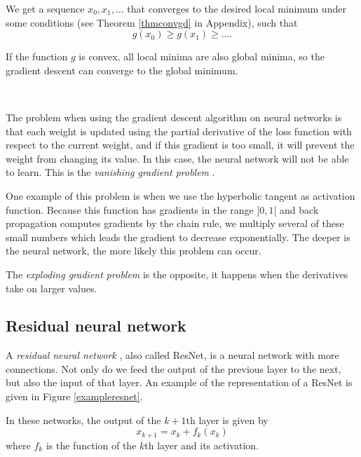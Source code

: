 \documentclass[10pt,a4paper]{article}
\theoremstyle{definition}
\theoremstyle{plain}
\begin{document}
We get a sequence $x_0,x_1,\dots$ that converges to the desired local minimum under some conditions (see Theorem \ref{thmconvgd} in Appendix), such that
$$
g(x_0) \geq g(x_1) \geq \dots . 
$$

If the function $g$ is convex, all local minima are also global minima, so the gradient descent can converge to the global minimum.

~

The problem when using the gradient descent algorithm on neural networks is that each weight is updated using the partial derivative of the loss function with respect to the current weight, and if this gradient is too small, it will prevent the weight from changing its value. In this case, the neural network will not be able to learn. This is the \textit{vanishing gradient problem} \cite{10}.

One example of this problem is when we use the hyperbolic tangent as activation function. Because this function has gradients in the range $]0,1[$ and back propagation computes gradients by the chain rule, we multiply several of these small numbers which leads the gradient to decrease exponentially. The deeper is the neural network, the more likely this problem can occur.

The \textit{exploding gradient problem} is the opposite, it happens when the derivatives take on larger values.


\subsection{Residual neural network} \label{rnn}

A\textit{ residual neural network} \cite{6}, also called ResNet, is a neural network with more connections. Not only do we feed the output of the previous layer to the next, but also the input of that layer. 
An example of the representation of a ResNet is given in Figure \ref{exampleresnet}.

In these networks, the output of the $k+1$th layer is given by
\begin{equation}\label{eqrn}
x_{k+1} = x_k + f_k(x_k)
\end{equation}
where $f_k$ is the function of the $k$th layer and its activation. 
\end{document}
